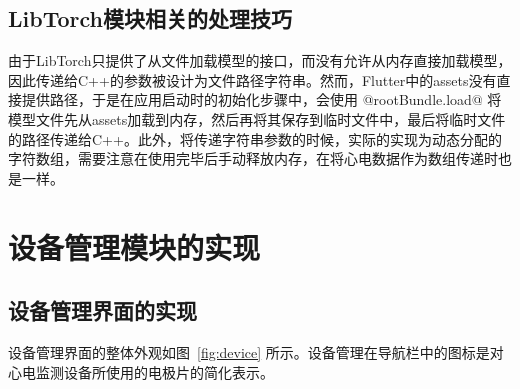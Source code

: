 \subsection{LibTorch模块相关的处理技巧}\label{subsec:libtorch}

由于LibTorch只提供了从文件加载模型的接口，而没有允许从内存直接加载模型，因此传递给C++的参数被设计为文件路径字符串。然而，Flutter中的assets没有直接提供路径，于是在应用启动时的初始化步骤中，会使用 @rootBundle.load@ 将模型文件先从assets加载到内存，然后再将其保存到临时文件中，最后将临时文件的路径传递给C++。此外，将传递字符串参数的时候，实际的实现为动态分配的字符数组，需要注意在使用完毕后手动释放内存，在将心电数据作为数组传递时也是一样。


\section{设备管理模块的实现}\label{sec:device}

\subsection{设备管理界面的实现}\label{subsec:device-ui}

设备管理界面的整体外观如图~\ref{fig:device} 所示。设备管理在导航栏中的图标是对心电监测设备所使用的电极片的简化表示。


